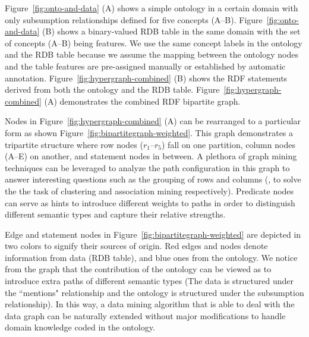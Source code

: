 \begin{myexp}
\label{exp:combineRdfBipartite}
Figure~\ref{fig:onto-and-data} (A) shows a simple ontology in a certain domain with only subsumption relationships defined for five concepts (A--B). Figure~\ref{fig:onto-and-data} (B) shows a binary-valued RDB table in the same domain with the set of concepts (A--B) being features. We use the same concept labels in the ontology and the RDB table because we assume the mapping between the ontology nodes and the table features are pre-assigned manually or established by automatic annotation. Figure~\ref{fig:hypergraph-combined} (B) shows the RDF statements derived from both the ontology and the RDB table. Figure~\ref{fig:hypergraph-combined} (A) demonstrates the combined RDF bipartite graph.

Nodes in Figure~\ref{fig:hypergraph-combined} (A) can be rearranged to a particular form as shown Figure~\ref{fig:bipartitegraph-weighted}. This graph demonstrates a tripartite structure where row nodes ($r_1$--$r_5$) fall on one partition, column nodes (A--E) on another, and statement nodes in between. A plethora of graph mining techniques can be leveraged to analyze the path configuration in this graph to answer interesting questions such as the grouping of rows and columns (\eg, to solve the the task of clustering and association mining respectively). Predicate nodes can serve as hints to introduce different weights to paths in order to distinguish different semantic types and capture their relative strengths.

Edge and statement nodes in Figure~\ref{fig:bipartitegraph-weighted} are depicted in two colors to signify their sources of origin. Red edges and nodes denote information from data (RDB table), and blue ones from the ontology. We notice from the graph that the contribution of the ontology can be viewed as to introduce extra paths of different semantic types (The data is structured under the ``mentions" relationship and the ontology is structured under the subsumption relationship). In this way, a data mining algorithm that is able to deal with the data graph can be naturally extended without major modifications to handle domain knowledge coded in the ontology.
\end{myexp}

